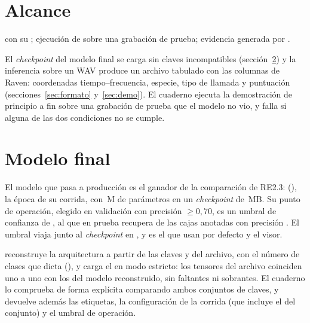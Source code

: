 \documentclass[12pt,a4paper]{article}
\begin{document}

\section{Alcance}

  con su
; ejecución de  sobre una grabación de
prueba; evidencia generada por .

 El \emph{checkpoint} del modelo final se carga sin claves incompatibles
(sección~\ref{sec:modelo}) y la inferencia sobre un WAV produce un archivo tabulado con las
columnas de Raven: coordenadas tiempo--frecuencia, especie, tipo de llamada y puntuación
(secciones~\ref{sec:formato} y~\ref{sec:demo}). El cuaderno ejecuta la demostración de
principio a fin sobre una grabación de prueba que el modelo no vio, y falla si alguna de las
dos condiciones no se cumple.

\section{Modelo final}
\label{sec:modelo}

El modelo que pasa a producción es el ganador de la comparación de RE2.3:
\code{\run} (\code{\architecture}), la época \epoch{} de su corrida, con \nParams{}\,M de
parámetros en un \emph{checkpoint} de \mb{}\,MB. Su punto de operación, elegido en validación
con precisión $\geq 0{,}70$, es un umbral de confianza de \threshold{}, al que en prueba
recupera \opRecall{} de las cajas anotadas con precisión \opPrecision{}. El umbral viaja junto
al \emph{checkpoint} en , y es el que usan por defecto
 y el visor.

 
reconstruye la arquitectura a partir de las claves  y  del
archivo, con el número de clases que dicta  (\nClasses{}), y carga el
 en modo estricto: los \nTensors{} tensores del archivo coinciden uno a uno
con los del modelo reconstruido, sin faltantes ni sobrantes. El cuaderno lo comprueba de forma
explícita comparando ambos conjuntos de claves, y devuelve además las etiquetas, la
configuración de la corrida (que incluye el  del conjunto) y el umbral de
operación.
\end{document}
